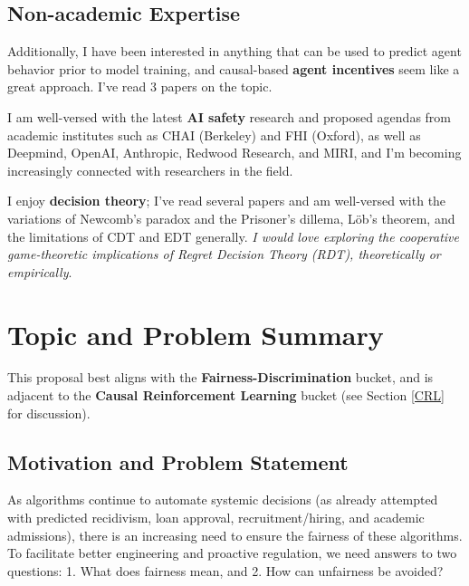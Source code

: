 \documentclass[letterpaper,10pt]{article}
\begin{document}

\subsection{Non-academic Expertise}
Additionally, I have been interested in anything that can be used to predict agent behavior prior to model training, and causal-based \textbf{agent incentives} seem like a great approach. I've read 3 papers on the topic.

I am well-versed with the latest \textbf{AI safety} research and proposed agendas from academic institutes such as CHAI (Berkeley) and FHI (Oxford), as well as Deepmind, OpenAI, Anthropic, Redwood Research, and MIRI, and I'm becoming increasingly connected with researchers in the field.

I enjoy \textbf{decision theory}; I've read several papers and am well-versed with the variations of Newcomb's paradox and the Prisoner's dillema, L\"{o}b's theorem, and the limitations of CDT and EDT generally. \emph{I would love exploring the cooperative game-theoretic implications of Regret Decision Theory (RDT), theoretically or empirically}.


\section{Topic and Problem Summary}

This proposal best aligns with the \textbf{Fairness-Discrimination} bucket, and is adjacent to the \textbf{Causal Reinforcement Learning} bucket (see Section \ref{CRL} for discussion).

\subsection{Motivation and Problem Statement}
As algorithms continue to automate systemic decisions (as already attempted with predicted recidivism, loan approval, recruitment/hiring, and academic admissions), there is an increasing need to ensure the fairness of these algorithms. To facilitate better engineering and proactive regulation, we need answers to two questions: 1. What does fairness mean, and 2. How can unfairness be avoided?
\end{document}
